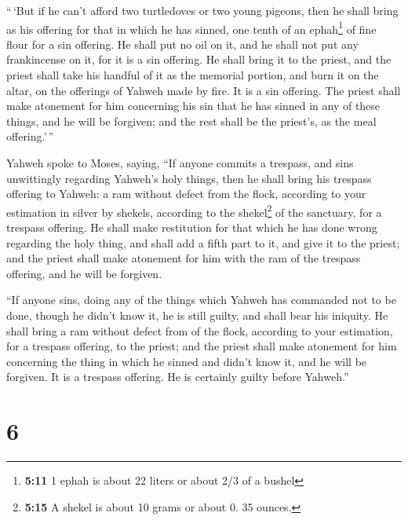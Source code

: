  ``\,`But if he can't afford two turtledoves or two young
pigeons, then he shall bring as his offering for that in which he has
sinned, one tenth of an ephah\footnote{\textbf{5:11} 1 ephah is about 22
  liters or about 2/3 of a bushel} of fine flour for a sin offering. He
shall put no oil on it, and he shall not put any frankincense on it, for
it is a sin offering.  He shall bring it to the priest,
and the priest shall take his handful of it as the memorial portion, and
burn it on the altar, on the offerings of Yahweh made by fire. It is a
sin offering.  The priest shall make atonement for him
concerning his sin that he has sinned in any of these things, and he
will be forgiven; and the rest shall be the priest's, as the meal
offering.'\,''

 Yahweh spoke to Moses, saying,  ``If
anyone commits a trespass, and sins unwittingly regarding Yahweh's holy
things, then he shall bring his trespass offering to Yahweh: a ram
without defect from the flock, according to your estimation in silver by
shekels, according to the shekel\footnote{\textbf{5:15} A shekel is
  about 10 grams or about 0. 35 ounces.} of the sanctuary, for a
trespass offering.  He shall make restitution for that
which he has done wrong regarding the holy thing, and shall add a fifth
part to it, and give it to the priest; and the priest shall make
atonement for him with the ram of the trespass offering, and he will be
forgiven.

 ``If anyone sins, doing any of the things which Yahweh
has commanded not to be done, though he didn't know it, he is still
guilty, and shall bear his iniquity.  He shall bring a
ram without defect from of the flock, according to your estimation, for
a trespass offering, to the priest; and the priest shall make atonement
for him concerning the thing in which he sinned and didn't know it, and
he will be forgiven.  It is a trespass offering. He is
certainly guilty before Yahweh.''

\hypertarget{section-5}{%
\section{6}\label{section-5}}

